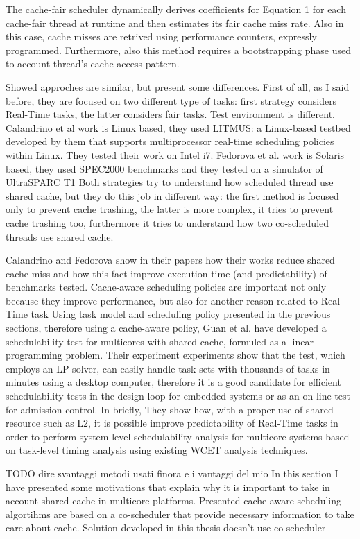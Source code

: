 \documentclass[a4paper,10pt]{article}
\begin{document}
\begin{multicols}{2}
The cache-fair scheduler dynamically derives coefficients for Equation 1 for each cache-fair thread at runtime and then estimates its fair cache 
miss rate. Also in this case, cache misses are retrived using performance counters, expressly programmed. Furthermore, also this method requires a 
bootstrapping phase used to account thread's cache access pattern. 

Showed approches are similar, but present some differences.
First of all, as I said before, they are focused on two different type of tasks: first strategy considers Real-Time tasks, 
the latter considers fair tasks.
Test environment is different. Calandrino et al work is Linux based, they used LITMUS: a Linux-based testbed developed by them that 
supports multiprocessor real-time scheduling policies within Linux. They tested their work on Intel i7.
Fedorova et al. work is Solaris based, they used SPEC2000 benchmarks and they tested on a simulator of UltraSPARC T1
Both strategies try to understand how scheduled thread use shared cache, but they do this job in different way: the first method is focused only
to prevent cache trashing, the latter is more complex, it tries to prevent cache trashing too, furthermore it tries to understand how two co-scheduled
threads use shared cache.

Calandrino and Fedorova show in their papers how their works reduce shared cache miss and how this fact improve execution time (and predictability) 
of benchmarks tested.
Cache-aware scheduling policies are important not only because they improve performance, but also for another reason related to Real-Time task
Using task model and scheduling policy presented in the previous sections, therefore using a cache-aware policy, Guan et al. have developed a 
schedulability test for multicores with shared cache, formuled as a linear programming problem.
Their experiment experiments show that the test, which employs an LP solver, can easily handle task sets with thousands of tasks in minutes using a 
desktop computer, therefore it is a good candidate for efficient schedulability tests in the design loop for embedded systems or as an
on-line test for admission control.
In briefly, They show how, with a proper use of shared resource such as L2, it is possible improve predictability
of Real-Time tasks in order to perform system-level schedulability analysis for multicore systems based on task-level timing analysis using
existing WCET analysis techniques.

TODO dire svantaggi metodi usati finora e i vantaggi del mio
In this section I have presented some motivations that explain why it is important to take in account shared cache in multicore platforms.
Presented cache aware scheduling algortihms are based on a co-scheduler that provide necessary information to take care about cache.
Solution developed in this thesis doesn't use co-scheduler 





\end{multicols}
\end{document}
